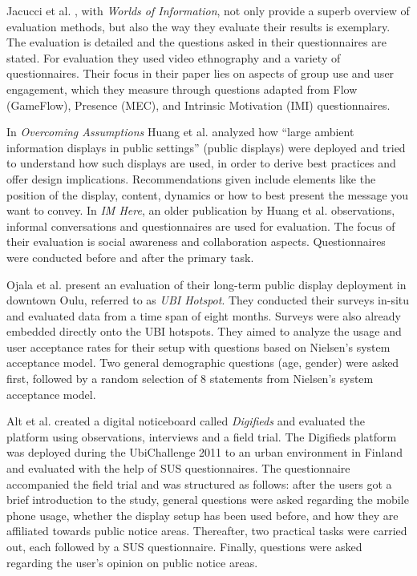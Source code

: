 	Jacucci et al. \cite{jacucci2010worldsofinformation}, with \textit{Worlds of Information}, not only provide a superb overview of evaluation methods, but also the way they evaluate their results is exemplary. The evaluation is detailed and the questions asked in their questionnaires are stated. For evaluation they used video ethnography and a variety of questionnaires. Their focus in their paper lies on aspects of group use and user engagement, which they measure through questions adapted from Flow (GameFlow), Presence (MEC), and Intrinsic Motivation (IMI) questionnaires.

	In \textit{Overcoming Assumptions} Huang et al. \cite{huang2008overcoming} analyzed how ``large ambient information displays in public settings'' (public displays) were deployed and tried to understand how such displays are used, in order to derive best practices and offer design implications. Recommendations given include elements like the position of the display, content, dynamics or how to best present the message you want to convey.
	In \textit{IM Here}, an older publication by Huang et al. \cite{Huang2004} observations, informal conversations and questionnaires are used for evaluation. The focus of their evaluation is social awareness and collaboration aspects. Questionnaires were conducted before and after the primary task.

	Ojala et al. present an evaluation of their long-term public display deployment in downtown Oulu, referred to as \textit{UBI Hotspot}. They conducted their surveys in-situ and evaluated data from a time span of eight months. Surveys were also already embedded directly onto the UBI hotspots. They aimed to analyze the usage and user acceptance rates for their setup with questions based on Nielsen's system acceptance model. Two general demographic questions (age, gender) were asked first, followed by a random selection of 8 statements from Nielsen's system acceptance model.


	Alt et al. \cite{alt2011digifieds} created a digital noticeboard called \textit{Digifieds} and evaluated the platform using observations, interviews and a field trial. The Digifieds platform was deployed during the UbiChallenge 2011 to an urban environment in Finland and evaluated with the help of SUS questionnaires. The questionnaire accompanied the field trial and was structured as follows: after the users got a brief introduction to the study, general questions were asked regarding the mobile phone usage, whether the display setup has been used before, and how they are affiliated towards public notice areas. Thereafter, two practical tasks were carried out, each followed by a SUS questionnaire. Finally, questions were asked regarding the user's opinion on public notice areas. 


